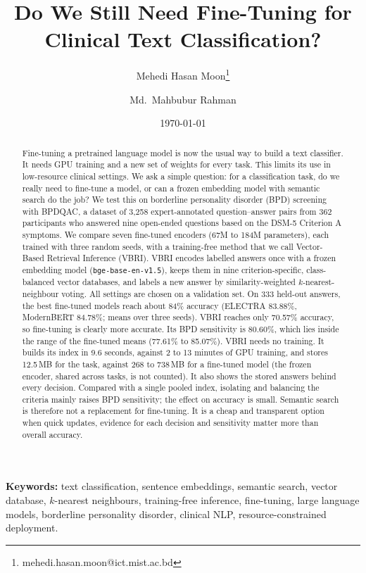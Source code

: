 \documentclass[11pt]{article}
\title{\textbf{Do We Still Need Fine-Tuning for Clinical Text Classification?
}}
\author[1]{Mehedi Hasan Moon\thanks{mehedi.hasan.moon@ict.mist.ac.bd}}
\author[1]{Md.\ Mahbubur Rahman}
\affil[1]{Department of Computer Science and Engineering, Military Institute of Science and Technology,
Mirpur Cantonment, Dhaka 1216, Bangladesh}
\date{\today}
\newcommand{\vbri}{VBRI}
\newcommand{\bpdqac}{BPDQAC}
\newcommand{\dsmv}{DSM-5}
\begin{document}
\maketitle

\begin{abstract}
Fine-tuning a pretrained language model is now the usual way to build a text classifier. It needs
GPU training and a new set of weights for every task. This limits its use in low-resource clinical
settings. We ask a simple question: for a classification task, do we really need to fine-tune a
model, or can a frozen embedding model with semantic search do the job? We test this on borderline
personality disorder (BPD) screening with \bpdqac{}, a dataset of 3,258 expert-annotated
question--answer pairs from 362 participants who answered nine open-ended questions based on the
\dsmv{} Criterion A symptoms. We compare seven fine-tuned encoders (67M to 184M parameters), each
trained with three random seeds, with a training-free method that we call Vector-Based Retrieval
Inference (\vbri{}). \vbri{} encodes labelled answers once with a frozen embedding model
(\texttt{bge-base-en-v1.5}), keeps them in nine criterion-specific, class-balanced vector
databases, and labels a new answer by similarity-weighted $k$-nearest-neighbour voting. All settings
are chosen on a validation set. On 333 held-out answers, the best fine-tuned models reach about
84\% accuracy (ELECTRA 83.88\%, ModernBERT 84.78\%; means over three seeds). \vbri{} reaches only
70.57\% accuracy, so fine-tuning is clearly more accurate. Its BPD sensitivity is 80.60\%, which
lies inside the range of the fine-tuned means (77.61\% to 85.07\%). \vbri{} needs no training. It
builds its index in 9.6 seconds, against 2 to 13 minutes of GPU training, and stores 12.5\,MB for
the task, against 268 to 738\,MB for a fine-tuned model (the frozen encoder, shared across tasks,
is not counted). It also shows the stored answers behind every decision. Compared with a single
pooled index, isolating and balancing the criteria mainly raises BPD sensitivity; the effect on
accuracy is small. Semantic search is therefore not a replacement for fine-tuning. It is a cheap and
transparent option when quick updates, evidence for each decision and sensitivity matter more than
overall accuracy.
\end{abstract}

\noindent\textbf{Keywords:} text classification, sentence embeddings, semantic search, vector
database, $k$-nearest neighbours, training-free inference, fine-tuning, large language models,
borderline personality disorder, clinical NLP, resource-constrained deployment.
\end{document}
